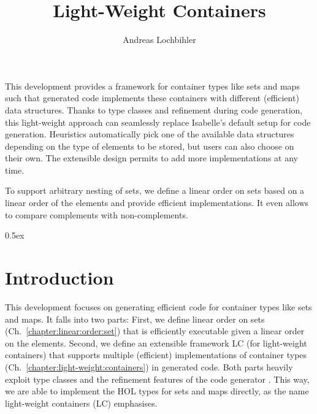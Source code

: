 \documentclass[11pt,a4paper]{book}
\makeatletter
\newenvironment{abstract}{%
  \small
  \begin{center}%
    {\bfseries \abstractname\vspace{-.5em}\vspace{\z@}}%
  \end{center}%
  \quotation}{\endquotation}
\makeatother
\begin{document}
\title{Light-Weight Containers}
\author{Andreas Lochbihler}
\maketitle

\begin{abstract}
  This development provides a framework for container types like sets and maps such that generated code implements these containers with different (efficient) data structures.
  Thanks to type classes and refinement during code generation, this light-weight approach can seamlessly replace Isabelle's default setup for code generation.
  Heuristics automatically pick one of the available data structures depending on the type of elements to be stored, but users can also choose on their own.
  The extensible design permits to add more implementations at any time.

  To support arbitrary nesting of sets, we define a linear order on sets based on a linear order of the elements and provide efficient implementations.
  It even allows to compare complements with non-complements.
\end{abstract}

\clearpage

\tableofcontents

\clearpage

\parindent 0pt\parskip 0.5ex

\chapter{Introduction}

This development focuses on generating efficient code for container types like sets and maps.
It falls into two parts: 
First, we define linear order on sets (Ch.~\ref{chapter:linear:order:set}) that is efficiently executable given a linear order on the elements.
Second, we define an extensible framework LC (for light-weight containers) that supports multiple (efficient) implementations of container types (Ch.~\ref{chapter:light-weight:containers}) in generated code.
Both parts heavily exploit type classes and the refinement features of the code generator \cite{HaftmannKrausKuncarNipkow2013ITP}.
This way, we are able to implement the HOL types for sets and maps directly, as the name light-weight containers (LC) emphasises.
\end{document}
